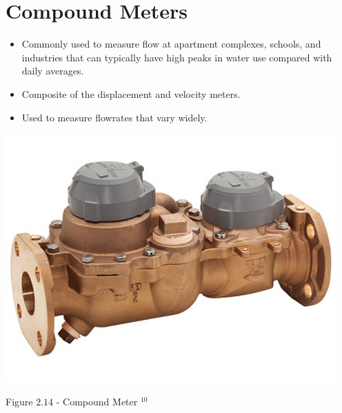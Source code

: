 \documentclass[10pt]{article}
\begin{document}
\section{Compound Meters}
\begin{itemize}
  \item Commonly used to measure flow at apartment complexes, schools, and industries that can typically have high peaks in water use compared with daily averages.

  \item Composite of the displacement and velocity meters.

  \item Used to measure flowrates that vary widely.

\end{itemize}
\includegraphics[max width=\textwidth]{CompoundMeter}

Figure $2.14$ - Compound Meter ${ }^{10}$
\end{document}
